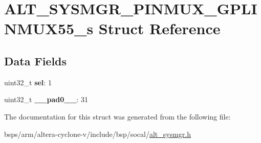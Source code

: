 \hypertarget{structALT__SYSMGR__PINMUX__GPLINMUX55__s}{}\section{A\+L\+T\+\_\+\+S\+Y\+S\+M\+G\+R\+\_\+\+P\+I\+N\+M\+U\+X\+\_\+\+G\+P\+L\+I\+N\+M\+U\+X55\+\_\+s Struct Reference}
\label{structALT__SYSMGR__PINMUX__GPLINMUX55__s}
\subsection*{Data Fields}
\begin{DoxyCompactItemize}
\item 
\mbox{\label{structALT__SYSMGR__PINMUX__GPLINMUX55__s_a5d66fb4e799cbd2fdf9eeb94d2363a35}} 
uint32\+\_\+t {\bfseries sel}\+: 1
\item 
\mbox{\label{structALT__SYSMGR__PINMUX__GPLINMUX55__s_a0f8ed4dac96aa475566ae6b7114bd29d}} 
uint32\+\_\+t {\bfseries \+\_\+\+\_\+pad0\+\_\+\+\_\+}\+: 31
\end{DoxyCompactItemize}


The documentation for this struct was generated from the following file\+:\begin{DoxyCompactItemize}
\item 
bsps/arm/altera-\/cyclone-\/v/include/bsp/socal/\mbox{\hyperlink{alt__sysmgr_8h}{alt\+\_\+sysmgr.\+h}}\end{DoxyCompactItemize}
